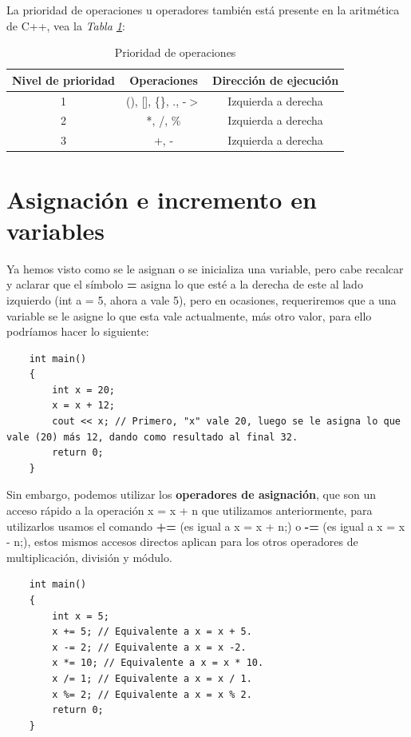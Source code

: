 La prioridad de operaciones u operadores también está presente en la aritmética de C++, vea la \textit{Tabla \ref{tab: 2}}:
\begin{table}[H]
    \begin{center}
        \caption{Prioridad de operaciones}
        \label{tab: 2}
        \begin{tabular}{c c c}
            \hline
            \textbf{Nivel de prioridad} & \textbf{Operaciones} & \textbf{Dirección de ejecución} \\
            \hline
            1	& (), [], \{\}, ., -$>$	& Izquierda a derecha \\
            2	& *, /, \%				& Izquierda a derecha \\
            3	& +, -					& Izquierda a derecha \\
            \hline
        \end{tabular}
    \end{center}
\end{table}



\section{Asignación e incremento en variables}
\hspace{0.55cm}Ya hemos visto como se le asignan o se inicializa una variable, pero cabe recalcar y aclarar que el símbolo \textbf{=} asigna lo que esté a la derecha de este al lado izquierdo (int a = 5, ahora a vale 5), pero en ocasiones, requeriremos que a una variable se le asigne lo que esta vale actualmente, más otro valor, para ello podríamos hacer lo siguiente:
\begin{lstlisting}
    int main()
    {
        int x = 20;
        x = x + 12;
        cout << x; // Primero, "x" vale 20, luego se le asigna lo que vale (20) más 12, dando como resultado al final 32.
        return 0;
    }
\end{lstlisting}

Sin embargo, podemos utilizar los \textbf{operadores de asignación}, que son un acceso rápido a la operación x = x + n que utilizamos anteriormente, para utilizarlos usamos el comando \textbf{+=} (es igual a x = x + n;) o \textbf{-=} (es igual a x = x - n;), estos mismos accesos directos aplican para los otros operadores de multiplicación, división y módulo.
\begin{lstlisting}
    int main()
    {
        int x = 5;
        x += 5; // Equivalente a x = x + 5.
        x -= 2; // Equivalente a x = x -2.
        x *= 10; // Equivalente a x = x * 10.
        x /= 1; // Equivalente a x = x / 1.
        x %= 2; // Equivalente a x = x % 2.
        return 0;
    }
\end{lstlisting}

